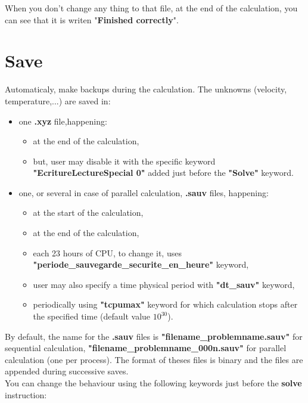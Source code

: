 When you don't change any thing to that file, at the end of the calculation, you can see that it is writen "\textbf{Finished correctly}".



\section{Save}
Automaticaly, \trust make backups during the calculation. The unknowns (velocity, temperature,...) are saved in:
\begin{itemize}
\item one \textbf{.xyz} file,happening:
    \begin{itemize}
    \item at the end of the calculation,
    \item but, user may disable it with the specific keyword \textbf{"EcritureLectureSpecial 0"} added just before the \textbf{"Solve"} keyword.
    \end{itemize}


\item one, or several in case of parallel calculation, \textbf{.sauv} files, happening:
    \begin{itemize}
    \item at the start of the calculation,
    \item at the end of the calculation,
    \item each 23 hours of CPU, to change it, uses \small \textbf{"periode\_sauvegarde\_securite\_en\_heure"} \normalsize keyword,
    \item user may also specify a time physical period with \textbf{"dt\_sauv"} keyword,
    \item periodically using \textbf{"tcpumax"} keyword for which calculation stops after the specified time (default value $10^{30}$).
    \end{itemize}
\end{itemize}


By default, the name for the \textbf{.sauv} files is \textbf{"filename\_problemname.sauv"} for sequential calculation, \textbf{"filename\_problemname\_000n.sauv"} for parallel calculation (one per process).
The format of theses files is binary and the files are appended during successive saves.\\

You can change the behaviour using the following keywords just before the \textbf{solve} instruction:


